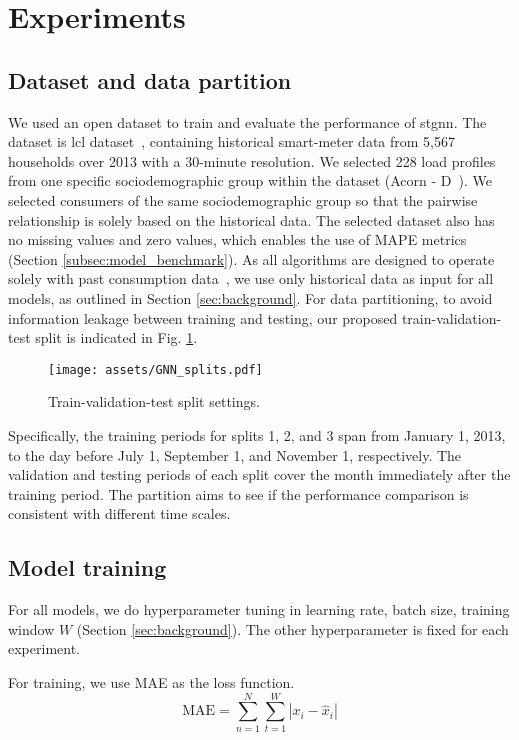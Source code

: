 \section{Experiments}\label{sec:exp_result}

\subsection{Dataset and data partition}
 We used an open dataset to train and evaluate the performance of \acrshort{stgnn}. The dataset is \acrfull{lcl} dataset~\cite{strbac_low_2024}, containing historical smart-meter data from 5,567 households over 2013 with a 30-minute resolution. We selected 228 load profiles from one specific sociodemographic group within the dataset (Acorn - D~\cite{acorn}). We selected consumers of the same sociodemographic group so that the pairwise relationship is solely based on the historical data. The selected dataset also has no missing values and zero values, which enables the use of MAPE metrics (Section \ref{subsec:model_benchmark}). As all algorithms are designed to operate solely with past consumption data~\cite{arastehfar_short-term_2022}, we use only historical data as input for all models, as outlined in Section \ref{sec:background}. 
 For data partitioning, to avoid information leakage between training and testing, our proposed train-validation-test split is indicated in Fig. \ref{fig:cross-val}.
\begin{figure}[h!]
    \centering
    \texttt{[image: assets/GNN\_splits.pdf]}
    \caption{Train-validation-test split settings.}
    \label{fig:cross-val}
\end{figure}

Specifically, the training periods for splits 1, 2, and 3 span from January 1, 2013, to the day before July 1, September 1, and November 1, respectively. The validation and testing periods of each split cover the month immediately after the training period. The partition aims to see if the performance comparison is consistent with different time scales.

\subsection{Model training}
  For all models, we do hyperparameter tuning in learning rate, batch size, training window $W$ (Section \ref{sec:background}). The other hyperparameter is fixed for each experiment. 

For training, we use MAE as the loss function.
\begin{equation}
    \text{MAE} = \sum_{n=1}^N\sum_{t=1}^W|x_i - \hat{x}_i|
\end{equation}


